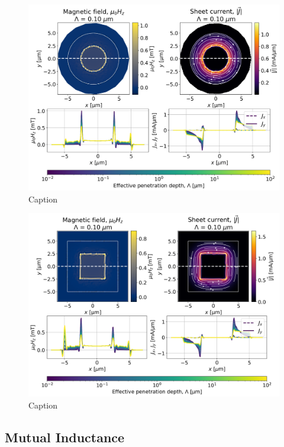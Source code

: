 \documentclass[preprint,12pt]{elsarticle}
\begin{document}
\begin{figure}
    \centering
    \includegraphics[scale=.40]{examples/images/ring/circular_ring_circulating_current.png}
    \caption{Caption}
    \label{fig:ring_circ_current}
\end{figure}

\begin{figure}
    \centering
    \includegraphics[scale=.40]{examples/images/ring/square_ring_circulating_current.png}
    \caption{Caption}
    \label{fig:square_ring_circ_current}
\end{figure}

\subsection{Mutual Inductance}
\label{section:examples:mutual-inductance}
\end{document}
